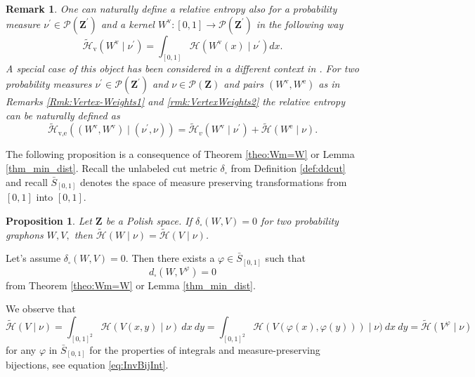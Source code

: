 \documentclass[12pt,twoside,a4paper]{article}
\newtheorem{proposition}{Proposition}[section]
\newtheorem{remark}[theorem]{Remark}
\newcommand{\Space}{\mathbf{Z}}
\newcommand{\Relabel}{\bar{S}_{[0,1]}}
\begin{document}
\begin{remark}
\label{rmk:VertexWeightedGraphs3}
One can naturally define a relative entropy also for a probability measure $\nu^{\prime}\in\mathcal{P}(\Space^{\prime})$ and a kernel $W^{\text{v}}:[0,1]\rightarrow \mathcal{P}(\Space^{\prime})$ in the following way  \[
\widetilde{\mathcal{H}}_{\text{v}}(W^{\text{v}}\mid \nu^{\prime})=\int_{[0,1]}
\mathcal{H}(W^{\text{v}}(x)\mid \nu^{\prime})dx.
\]
A special case of this object has been considered in a different context in \cite[Definition 1]{kuehn2024global}. For two probability measures $\nu^{\prime}\in\mathcal{P}(\Space^{\prime})$ and $\nu\in\mathcal{P}(\Space)$ and pairs $(W^{\text{v}},W^{\text{e}})$ as in Remarks \ref{Rmk:Vertex-Weights1} and \ref{rmk:VertexWeights2} the relative entropy can be naturally defined as \begin{equation}\label{eq:RelEntropyVertexWeight}
   \widetilde{\mathcal{H}}_{\text{v},\text{e}}((W^{\text{v}},W^{\text{v}})\mid (\nu^{\prime},\nu))=\widetilde{\mathcal{H}}_v(W^{\text{v}}\mid \nu^{\prime})+\widetilde{\mathcal{H}}(W^{\text{e}}\mid \nu). 
\end{equation}
\end{remark}

The following proposition is a consequence of Theorem \ref{theo:Wm=W} or Lemma \ref{thm_min_dist}. Recall the unlabeled cut metric $\delta_{\square}$ from Definition \ref{def:ddcut} and recall $\Relabel$ denotes the space of measure preserving transformations from $[0,1]$ into $[0,1].$

\begin{proposition}\label{PropWellPosRelEntropyQuot}
Let $\Space$ be a Polish space. If $\delta_{\square}(W, V) = 0$ for two probability graphons $W, V,$ then $\widetilde{\mathcal{H}}(W \mid \nu)=\widetilde{\mathcal{H}}(V \mid \nu)$. 
\end{proposition}
\proof
Let's assume $\delta_{\square}(W, V) = 0.$ Then there exists a $\varphi \in \Relabel$ such that  \[
d_{\square}(W, V^{\varphi}) = 0
\]
from Theorem \ref{theo:Wm=W} or Lemma \ref{thm_min_dist}.

We observe that 
\begin{equation}
    \widetilde{\mathcal{H}}(V \mid \nu) =\int_{[0,1]^2} \mathcal{H}(V(x,y) \mid \nu)\ dx\ dy=\int_{[0,1]^2} \mathcal{H}(V(\varphi(x),\varphi(y))) \mid \nu)\ dx\ dy=\widetilde{\mathcal{H}}(V^{\varphi} \mid \nu) 
\end{equation}
for any $\varphi$ in $\Relabel$ for the properties of integrals and measure-preserving bijections, see equation \eqref{eq:InvBijInt}.
\endproof
\end{document}
